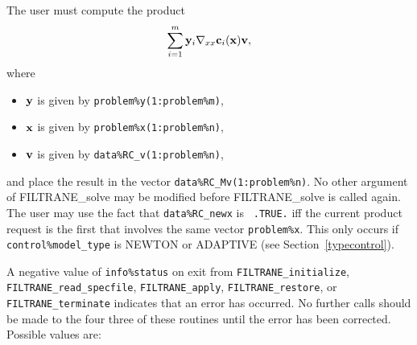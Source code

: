 \documentclass{galahad}
\newcommand{\packagename}{FILTRANE}
\newcommand{\sym}{\sf\small}
\begin{document}
\begin{description}
 The user must compute the product
\[
     \sum_{i=1}^m {\mathbf{y}}_i \nabla_{xx} {\mathbf{c}}_i( {\mathbf{x}} ) {\mathbf{v}},
\]
where
\begin{itemize}
\item ${\mathbf{y}}$ is given by {\tt problem\%y(1:problem\%m)},
\item ${\mathbf{x}}$ is given by {\tt problem\%x(1:problem\%n)},
\item ${\mathbf{v}}$ is given by {\tt data\%RC\_v(1:problem\%n)},
\end{itemize}
and place the result in the vector {\tt data\%RC\_Mv(1:problem\%n)}. No other
argument of \packagename\_solve may be modified before \packagename\_solve
is called again. The user may use the fact that {\tt data\%RC\_newx} is {\tt
.TRUE.} iff the current product request is the first that involves the same
vector {\tt problem\%x}. This only occurs if {\tt control\%model\_type} is
{\sym NEWTON} or {\sym ADAPTIVE}
(see Section~\ref{typecontrol}).
\end{description}


\galerrors
A negative value of {\tt info\%status} on exit from
{\tt \packagename\_initialize},
{\tt \packagename\_read\_specfile},
{\tt \packagename\_apply},
{\tt \packagename\_restore},
or
{\tt \packagename\_terminate}
indicates that an error has occurred. No further calls should be made
to the four three of these routines until the error has been
corrected. Possible values are:
\end{document}
